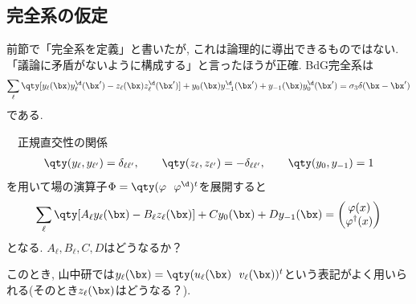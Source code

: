 \documentclass[10.5pt,a4paper]{jreport}
\begin{document}
\subsection{完全系の仮定}
前節で「完全系を定義」と書いたが, これは論理的に導出できるものではない. 「議論に矛盾がないように構成する」と言ったほうが正確. BdG完全系は
\begin{eqnarray}
  \sum_{\ell}\qty[y_{\ell}(\bx)y^\d_{\ell}(\bx') - z_{\ell}(\bx)z^\d_{\ell}(\bx')] + y_{0}(\bx)y^\d_{-1}(\bx') + y_{-1}(\bx)y^\d_{0}(\bx')  = \sigma_3\delta(\bx - \bx')\label{completeness2}
\end{eqnarray}
である. 
\begin{screen}
  \ \ 正規直交性の関係
  \begin{eqnarray}
    \qty(y_{\ell}, y_{\ell'}) = \delta_{\ell\ell'}, \hspace{0.7cm}\qty(z_{\ell}, z_{\ell'}) = -\delta_{\ell\ell'}, \hspace{0.7cm}\qty(y_{0}, y_{-1}) = 1
  \end{eqnarray}
  を用いて場の演算子$\Phi = \qty(\varphi\ \ \varphi^\d)^t$を展開すると
  \begin{eqnarray}
    \sum_{\ell}\qty[A_\ell y_{\ell}(\bx) - B_\ell z_{\ell}(\bx)] + Cy_{0}(\bx) + Dy_{-1}(\bx)  =
    \begin{pmatrix}
      \varphi(x)\\
      \varphi^\dagger(x)
    \end{pmatrix}
  \end{eqnarray}
  となる. $A_\ell , B_\ell , C, D$はどうなるか？
\end{screen}
このとき, 山中研では$y_\ell(\bx) = \qty(u_\ell (\bx)\ \ v_\ell (\bx))^t$という表記がよく用いられる(そのとき$z_\ell(\bx)$はどうなる？).
\end{document}
